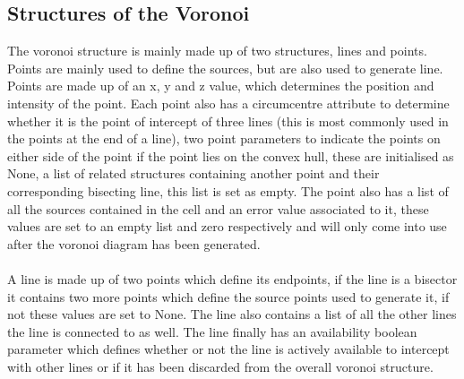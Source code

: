 \subsection{Structures of the Voronoi}
The voronoi structure is mainly made up of two structures, lines and points. Points are mainly used to define the sources, but are also used to generate line. Points are made up of an x, y and z value, which determines the position and intensity of the point. Each point also has a circumcentre attribute to determine whether it is the point of intercept of three lines (this is most commonly used in the points at the end of a line), two point parameters to indicate the points on either side of the point if the point lies on the convex hull, these are initialised as None, a list of related structures containing another point and their corresponding bisecting line, this list is set as empty. The point also has a list of all the sources contained in the cell and an error value associated to it, these values are set to an empty list and zero respectively and will only come into use after the voronoi diagram has been generated.
\\
\\
A line is made up of two points which define its endpoints, if the line is a bisector it contains two more points which define the source points used to generate it, if not these values are set to None. The line also contains a list of all the other lines the line is connected to as well. The line finally has an availability boolean parameter which defines whether or not the line is actively available to intercept with other lines or if it has been discarded from the overall voronoi structure.

